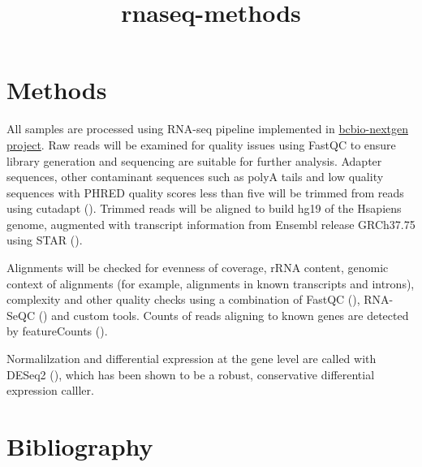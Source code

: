 \documentclass[11pt]{article}
\date{}
\title{rnaseq-methods}
\begin{document}
\maketitle

\section{Methods}

All samples are processed using RNA-seq pipeline implemented in
\href{http://bcbio-nextgen.readthedocs.org/en/latest/}{bcbio-nextgen project}.
Raw reads will be examined for quality
issues using FastQC to ensure library generation and sequencing are
suitable for further analysis. Adapter sequences, other contaminant
sequences such as polyA tails and low quality sequences with PHRED
quality scores less than five will be trimmed from reads using
cutadapt (\cite{Martin:2011va}). Trimmed reads will be aligned to build
hg19 of the Hsapiens genome, augmented with transcript information from
Ensembl release GRCh37.75 using STAR (\cite{Dobin:2013fg}).

Alignments will be checked for evenness of coverage, rRNA content,
genomic context of alignments (for example, alignments in known
transcripts and introns), complexity and other quality checks using a
combination of FastQC (\cite{Andrews:2010}), RNA-SeQC (\cite{DeLuca:2012dp}) and custom tools.
Counts of reads aligning to known genes are detected by featureCounts (\cite{Anonymous:2014cj}).

Normalilzation and differential expression at the gene level are called with
DESeq2 (\cite{Love:2014do}), which has been shown to be a robust,
conservative differential expression calller.

\section{Bibliography}


\end{document}

